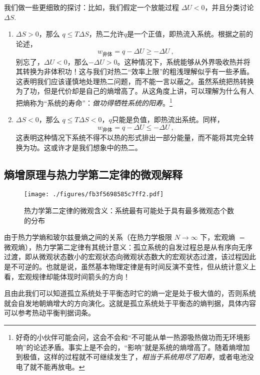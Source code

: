 我们做一些更细致的探讨：比如，我们假定一个放能过程 $\Delta U < 0$，并且分类讨论 $\Delta S$.
\begin{enumerate}
\item $\Delta S > 0$，那么 $q \le T\Delta S$，热二允许$q$是一个正值，即热流入系统。根据之前的论述，
$$
w_\text{非体} = q - \Delta U \ge - \Delta U 
~,
$$
别忘了，$\Delta U<0$，那么$-\Delta U>0$。这种情况下，系统能够从外界吸收热并将其转换为非体积功！这与我们对热二“效率上限”的粗浅理解似乎有一些矛盾。这表明我们应该谨慎地处理热二问题，而不能一言以蔽之。虽然系统把热转换为了功，但是代价却是自己的熵增高了。从这角度上讲，可以理解为什么有人把熵称为“系统的寿命”：\textsl{做功得牺牲系统的阳寿}。\footnote{好奇的小伙伴可能会问，这会不会和“不可能从单一热源吸热做功而无环境影响”的论述矛盾。事实上是不会的，“影响”就是系统的熵增高了。随着熵增加到极值，这样的过程就不可继续发生了，\textsl{相当于系统用尽了阳寿}，或者电池没电了就不能再放电。}
\item $\Delta S < 0$，那么 $q \le T\Delta S < 0$，$q$只能是负值，即热流出系统。同样，
$$
w_\text{非体} = q - \Delta U \le - \Delta U 
~,
$$
这表明这种情况下系统不得不以热的形式排出一部分能量，而不能将其完全转换为功。这或许才是我们想象中的热二。
\end{enumerate}


\subsection{熵增原理与热力学第二定律的微观解释}
\begin{figure}[ht]
\centering
\texttt{[image: ./figures/fb3f5698585c7ff2.pdf]}
\caption{热力学第二定律的微观含义：系统最有可能处于具有最多微观态个数的分布} \label{fig_Td2Law_4}
\end{figure}
由于热力学熵和玻尔兹曼熵之间的关系（在热力学极限 $N\rightarrow \infty$ 下，宏观熵 $=$ 微观熵），热力学第二定律有其统计意义：孤立系统的自发过程总是从有序向无序过渡，即从微观状态数小的宏观状态向微观状态数大的宏观状态过渡，该过程因此是不可逆的。也就是说，虽然基本物理定律是有时间反演不变性，但从统计意义上看，宏观规律却能体现时间箭头的方向！

且由此我们可以知道孤立系统处于平衡态时它的熵一定是处于极大值的，否则系统就会自发地朝熵增大的方向演化。这就是孤立系统处于平衡态的熵判据，具体内容可以参考热动平衡判据词条。
